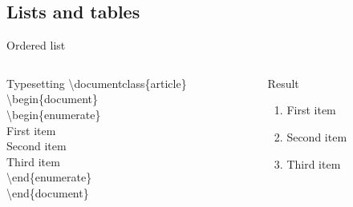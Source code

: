 \documentclass[10pt,xcolor={dvipsnames}]{beamer}
\begin{document}
	\subsection{Lists and tables}
		\begin{frame}{Ordered list}
			\begin{columns}[T]
				
				\begin{column}{.5 \textwidth}
					\onslide<2->
					\begin{block}{Typesetting}
						\textbackslash documentclass\{{\color{blue}article}\}\\
						
						\textbackslash begin\{{\color{blue}document}\}\\
						
							\quad\textbackslash begin\{{\color{orange}enumerate}\}\\
								 First item\\
								 Second item\\
								 Third item\\
							\quad\textbackslash end\{{\color{orange}enumerate}\}\\

						\textbackslash end\{{\color{blue}document}\}
					\end{block}
				\end{column}
				
				\begin{column}{.5 \textwidth}
					\onslide<3->
					\begin{block}{Result}
						\begin{enumerate}
							\item First item
							\item Second item
							\item Third item
						\end{enumerate}
					\end{block}
				\end{column}
				
			\end{columns}
		\end{frame}
	
\end{document}
